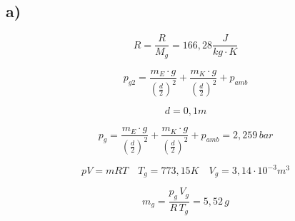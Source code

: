 

\subsection*{a)}

\[
R = \frac{R}{M_g} = 166{,}28 \frac{J}{kg \cdot K}
\]

\[
p_{g2} = \frac{m_E \cdot g}{\left(\frac{d}{2}\right)^2} + \frac{m_K \cdot g}{\left(\frac{d}{2}\right)^2} + p_{amb}
\]

\[
d = 0{,}1m
\]

\[
p_{g} = \frac{m_E \cdot g}{\left(\frac{d}{2}\right)^2} + \frac{m_K \cdot g}{\left(\frac{d}{2}\right)^2} + p_{amb} = 2{,}259 \, bar
\]

\[
pV = mRT \quad T_g = 773{,}15K \quad V_g = 3{,}14 \cdot 10^{-3} m^3
\]

\[
m_g = \frac{p_g \, V_g}{R \, T_g} = 5{,}52 \, g
\]